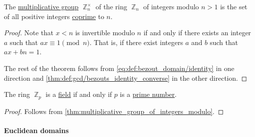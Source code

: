 \begin{proposition}\label{thm:multiplicative_group_of_integers_modulo}
  The \hyperref[def:semiring]{multiplicative group} \( \BbbZ_n^\times \) of the ring \hyperref[def:ring_of_integers_modulo]{\( \BbbZ_n \)} of integers modulo \( n > 1 \) is the set of all positive integers \hyperref[def:coprime_elements]{coprime} to \( n \).
\end{proposition}
\begin{proof}
  Note that \( x < n \) is invertible modulo \( n \) if and only if there exists an integer \( a \) such that \( ax \equiv 1 \pmod n \). That is, if there exist integers \( a \) and \( b \) such that \( ax + bn = 1 \).

  The rest of the theorem follows from \eqref{eq:def:bezout_domain/identity} in one direction and \cref{thm:def:gcd/bezouts_identity_converse} in the other direction.
\end{proof}

\begin{corollary}\label{thm:zp_is_field}
  The ring \( \BbbZ_p \) is a \hyperref[def:field]{field} if and only if \( p \) is a \hyperref[def:prime_number]{prime number}.
\end{corollary}
\begin{proof}
  Follows from \cref{thm:multiplicative_group_of_integers_modulo}.
\end{proof}

\paragraph{Euclidean domains}

